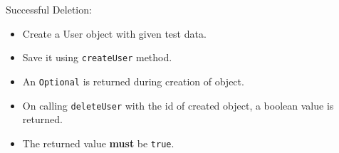 \documentclass[]{article}
\providecommand{\tightlist}{%
  \setlength{\itemsep}{0pt}\setlength{\parskip}{0pt}}
\begin{document}
Successful Deletion:

\begin{itemize}
\tightlist
\item
  Create a User object with given test data.
\item
  Save it using \texttt{createUser} method.
\item
  An \texttt{Optional} is returned during creation of object.
\item
  On calling \texttt{deleteUser} with the id of created object, a
  boolean value is returned.
\item
  The returned value \textbf{must} be \texttt{true}.
\end{itemize}
\end{document}
